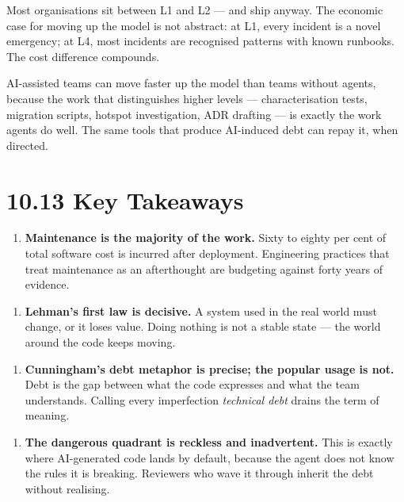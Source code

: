 \documentclass[11pt,a4paper]{book}
\begin{document}
Most organisations sit between L1 and L2 --- and ship anyway. The economic case for moving up the model is not abstract: at L1, every incident is a novel emergency; at L4, most incidents are recognised patterns with known runbooks. The cost difference compounds.

AI-assisted teams can move faster up the model than teams without agents, because the work that distinguishes higher levels --- characterisation tests, migration scripts, hotspot investigation, ADR drafting --- is exactly the work agents do well. The same tools that produce AI-induced debt can repay it, when directed.

\medskip

\section{10.13 Key Takeaways}

\begin{enumerate}
  \item \textbf{Maintenance is the majority of the work.} Sixty to eighty per cent of total software cost is incurred after deployment. Engineering practices that treat maintenance as an afterthought are budgeting against forty years of evidence.
\end{enumerate}

\begin{enumerate}
  \item \textbf{Lehman's first law is decisive.} A system used in the real world must change, or it loses value. Doing nothing is not a stable state --- the world around the code keeps moving.
\end{enumerate}

\begin{enumerate}
  \item \textbf{Cunningham's debt metaphor is precise; the popular usage is not.} Debt is the gap between what the code expresses and what the team understands. Calling every imperfection \textit{technical debt} drains the term of meaning.
\end{enumerate}

\begin{enumerate}
  \item \textbf{The dangerous quadrant is reckless and inadvertent.} This is exactly where AI-generated code lands by default, because the agent does not know the rules it is breaking. Reviewers who wave it through inherit the debt without realising.
\end{enumerate}
\end{document}
